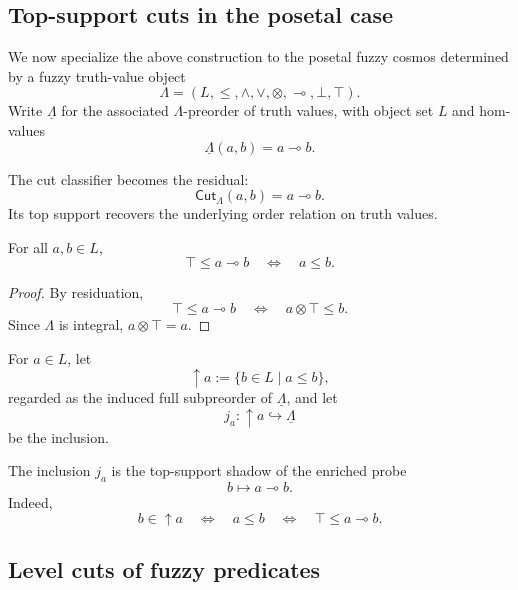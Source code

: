 \subsection{Top-support cuts in the posetal case}
\label{subsec:top-support-cuts-posetal-case}

We now specialize the above construction to the posetal fuzzy cosmos determined by a fuzzy truth-value object
\[
    \Lambda=(L,\leq,\wedge,\vee,\otimes,\multimap,\bot,\top).
\]
Write \(\underline{\Lambda}\) for the associated \(\Lambda\)-preorder of truth values, with object set \(L\) and hom-values
\[
    \underline{\Lambda}(a,b)=a\multimap b.
\]

The cut classifier becomes the residual:
\[
    \mathsf{Cut}_\Lambda(a,b)=a\multimap b.
\]
Its top support recovers the underlying order relation on truth values.

\begin{proposition}
\label{prop:top-support-residual-classifier}
    For all \(a,b\in L\),
    \[
        \top\leq a\multimap b
        \quad\Longleftrightarrow\quad
        a\leq b.
    \]
\end{proposition}

\begin{proof}
    By residuation,
    \[
        \top\leq a\multimap b
        \quad\Longleftrightarrow\quad
        a\otimes\top\leq b.
    \]
    Since \(\Lambda\) is integral, \(a\otimes\top=a\).
\end{proof}

\begin{definition}
\label{def:principal-upper-cut-classifiers}
    For \(a\in L\), let
    \[
        \uparrow a:=\{b\in L\mid a\leq b\},
    \]
    regarded as the induced full subpreorder of \(\underline{\Lambda}\), and let
    \[
        j_a:\uparrow a\hookrightarrow\underline{\Lambda}
    \]
    be the inclusion.
\end{definition}

The inclusion \(j_a\) is the top-support shadow of the enriched probe
\[
    b\longmapsto a\multimap b.
\]
Indeed,
\[
    b\in\uparrow a
    \quad\Longleftrightarrow\quad
    a\leq b
    \quad\Longleftrightarrow\quad
    \top\leq a\multimap b.
\]

\subsection{Level cuts of fuzzy predicates}
\label{subsec:level-cuts-of-fuzzy-predicates}

